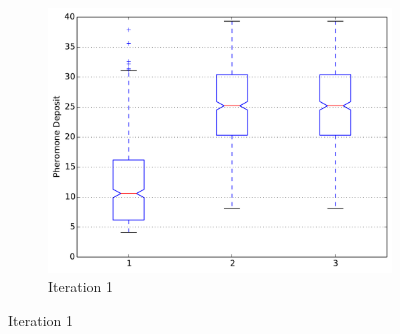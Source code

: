 \documentclass{llncs}
\begin{document}
	
	\begin{figure}[H]
        \centering
        \begin{subfigure}[b]{0.3\textwidth}
                \includegraphics[width=\textwidth]{PLT/Comparision/BOXPLOT/Iteration1}
                \caption{Iteration 1}
                \label{fig:plt_iter1}
        \end{subfigure}
        

\end{figure}
\end{document}
